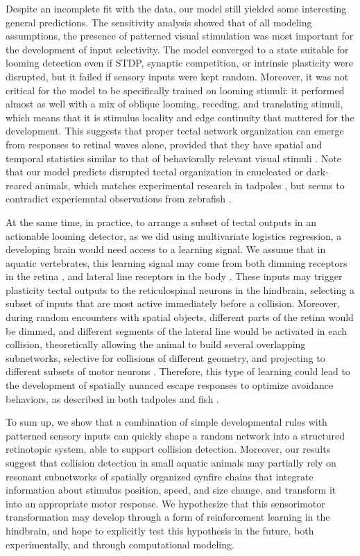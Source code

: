 \documentclass{article}
\begin{document}
Despite an incomplete fit with the data, our model still yielded some interesting general predictions. The sensitivity analysis showed that of all modeling assumptions, the presence of patterned visual stimulation was most important for the development of input selectivity. The model converged to a state suitable for looming detection even if STDP, synaptic competition, or intrinsic plasticity were disrupted, but it failed if sensory inputs were kept random. Moreover, it was not critical for the model to be specifically trained on looming stimuli: it performed almost as well with a mix of oblique looming, receding, and translating stimuli, which means that it is stimulus locality and edge continuity that mattered for the development. This suggests that proper tectal network organization can emerge from responses to retinal waves alone, provided that they have spatial and temporal statistics similar to that of behaviorally relevant visual stimuli \citep{huberman2008waves}. Note that our model predicts disrupted tectal organization in enucleated or dark-reared animals, which matches experimental research in tadpoles \citep{xu2011}, but seems to contradict experiemntal observations from zebrafish \citep{pietri2017emergence}.

At the same time, in practice, to arrange a subset of tectal outputs in an actionable looming detector, as we did using multivariate logistics regression, a developing brain would need access to a learning signal. We assume that in aquatic vertebrates, this learning signal may come from both dimming receptors in the retina \citep{baranauskas2012}, and lateral line receptors in the body \citep{truszkowski2017}. These inputs may trigger plasticity tectal outputs to the reticulospinal neurons in the hindbrain, selecting a subset of inputs that are most active immediately before a collision. Moreover, during random encounters with spatial objects, different parts of the retina would be dimmed, and different segments of the lateral line would be activated in each collision, theoretically allowing the animal to build several overlapping subnetworks, selective for collisions of different geometry, and projecting to different subsets of motor neurons \citep{helmbrecht2018topography}. Therefore, this type of learning could lead to the development of spatially nuanced escape responses to optimize avoidance behaviors, as described in both tadpoles \citep{khakhalin2014} and fish \citep{bhattacharyya2017assessment}.

To sum up, we show that a combination of simple developmental rules with patterned sensory inputs can quickly shape a random network into a structured retinotopic system, able to support collision detection. Moreover, our results suggest that collision detection in small aquatic animals may partially rely on resonant subnetworks of spatially organized synfire chains that integrate information about stimulus position, speed, and size change, and transform it into an appropriate motor response. We hypothesize that this sensorimotor transformation may develop through a form of reinforcement learning in the hindbrain, and hope to explicitly test this hypothesis in the future, both experimentally, and through computational modeling.
\end{document}
